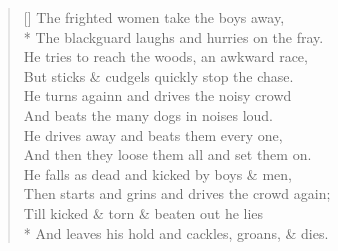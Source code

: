 \documentclass[MAIN]{subfiles}
\begin{document}
\begin{verse}[\versewidth]
The frighted women take the boys away,\\*
The blackguard laughs and hurries on the fray.\\
He tries to reach the woods, an awkward race,\\
But sticks \& cudgels quickly stop the chase.\\
He turns againn and drives the noisy crowd\\
And beats the many dogs in noises loud.\\
He drives away and beats them every one,\\
And then they loose them all and set them on.\\
He falls as dead and kicked by boys \& men,\\
Then starts and grins and drives the crowd again;\\
Till kicked \& torn \& beaten out he lies\\*
And leaves his hold and cackles, groans, \& dies.
\end{verse}
\end{document}
